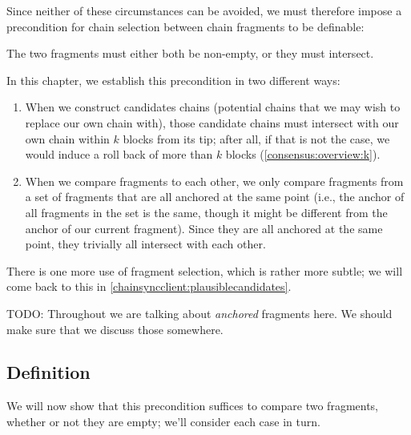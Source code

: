 Since neither of these circumstances can be avoided, we must therefore impose a
precondition for chain selection between chain fragments to be definable:

\begin{definition}
The two fragments must either both be non-empty, or they must intersect.
\end{definition}

In this chapter, we establish this precondition in two different ways:

\begin{enumerate}
\item When we construct candidates chains (potential chains that we may wish
to replace our own chain with), those candidate chains must intersect with
our own chain within $k$ blocks from its tip; after all, if that is not the
case, we would induce a roll back of more than $k$ blocks
(\cref{consensus:overview:k}).

\item When we compare fragments to each other, we only compare fragments from a
set of fragments that are all anchored at the same point (i.e., the anchor of
all fragments in the set is the same, though it might be different from the
anchor of our current fragment). Since they are all anchored at the same point,
they trivially all intersect with each other.
\end{enumerate}

There is one more use of fragment selection, which is rather more subtle;
we will come back to this in \cref{chainsyncclient:plausiblecandidates}.

 TODO: Throughout we are talking about \emph{anchored} fragments
here. We should make sure that we discuss those somewhere.

\subsection{Definition}
\label{chainsel:fragments:definition}

We will now show that this precondition suffices to compare two fragments,
whether or not they are empty; we'll consider each case in turn.

